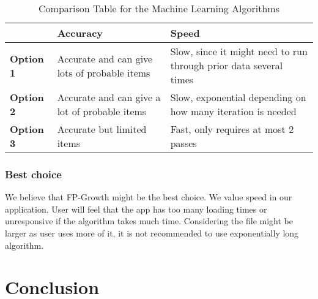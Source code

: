 \documentclass[journal,compsoc, 10pt, draftclsnofoot, onecolumn]{IEEEtran}
\begin{document}
\begin{table}[h]
	\centering
	\caption{Comparison Table for the Machine Learning Algorithms}
	\label{Comparison Table for the Machine Learning Algorithms}
	\begin{tabularx}{\textwidth}{|X|X|X|}
		\hline
		\textbf{}         & \textbf{Accuracy}                & \textbf{Speed} 
		\\ \hline
\textbf{Option 1} & Accurate and can give lots of probable items & Slow, since it
might need to run through prior data several times
		\\ \hline
\textbf{Option 2} & Accurate and can give a lot of probable items & Slow, exponential
depending on how many iteration is needed
		\\ \hline
\textbf{Option 3} & Accurate but limited items & Fast, only requires at most 2 passes		\\ \hline
	\end{tabularx}
\end{table}

\subsubsection{Best choice}
We believe that FP-Growth might be the best choice. We value speed in our
application. User will feel that the app has too many loading times or unresponsive
if the algorithm takes much time. Considering the file might be larger as user uses
more of it, it is not recommended to use exponentially long algorithm.

\section{Conclusion}
\end{document}
